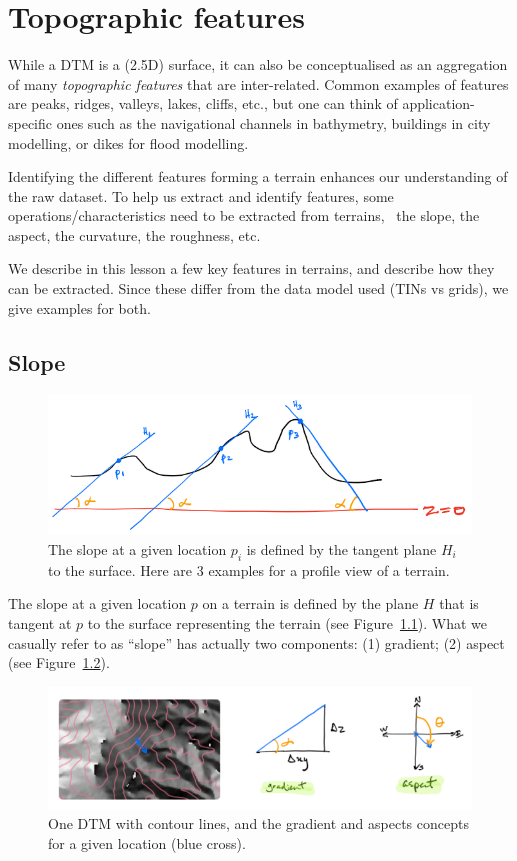 
\graphicspath{{topofeatures/}}


\chapter{Topographic features}


While a DTM is a (2.5D) surface, it can also be conceptualised as an aggregation of many \emph{topographic features} that are inter-related.
Common examples of features are peaks, ridges, valleys, lakes, cliffs, etc., but one can think of application-specific ones such as the navigational channels in bathymetry, buildings in city modelling, or dikes for flood modelling.

Identifying the different features forming a terrain enhances our understanding of the raw dataset.
To help us extract and identify features, some operations/characteristics need to be extracted from terrains, \eg\ the slope, the aspect, the curvature, the roughness, etc.

We describe in this lesson a few key features in terrains, and describe how they can be extracted.
Since these differ from the data model used (TINs vs grids), we give examples for both.


%
\section{Slope}

\begin{figure}
  \centering
  \includegraphics[width=0.7\linewidth]{figs/slope_concept}
  \caption{The slope at a given location $p_i$ is defined by the tangent plane $H_i$ to the surface. Here are 3 examples for a profile view of a terrain.}
\label{fig:slope_concept}
\end{figure}

The slope at a given location $p$ on a terrain is defined by the plane $H$ that is tangent at $p$ to the surface representing the terrain (see Figure~\ref{fig:slope_concept}).
What we casually refer to as ``slope'' has actually two components: (1) gradient; (2) aspect (see Figure~\ref{fig:slope_aspect}).
\begin{figure}
  \centering
  \includegraphics[width=\linewidth]{figs/slope_aspect}
  \caption{One DTM with contour lines, and the gradient and aspects concepts for a given location (blue cross).}
\label{fig:slope_aspect}
\end{figure}


